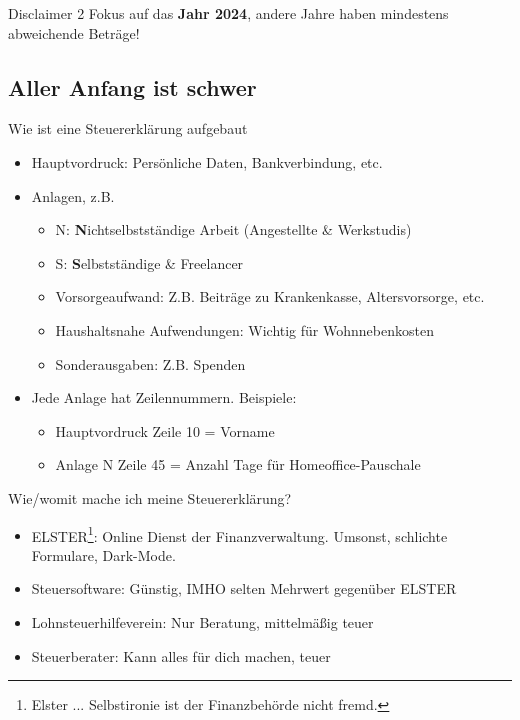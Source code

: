 \documentclass{beamer}
\begin{document}
		\begin{frame}{Disclaimer 2}
			Fokus auf das \textbf{Jahr 2024}, andere Jahre haben mindestens abweichende Beträge!
		\end{frame}
	
		\subsection{Aller Anfang ist schwer}

			\begin{frame}{Wie ist eine Steuererklärung aufgebaut}
				\begin{itemize}
					\item Hauptvordruck: Persönliche Daten, Bankverbindung, etc.
					\item Anlagen, z.B.
					\begin{itemize}
						\item N: \textbf{N}ichtselbstständige Arbeit (Angestellte \& Werkstudis)
						\item S: \textbf{S}elbstständige \& Freelancer
						\item Vorsorgeaufwand: Z.B. Beiträge zu Krankenkasse, Altersvorsorge, etc.
						\item Haushaltsnahe Aufwendungen: Wichtig für Wohnnebenkosten
						\item Sonderausgaben: Z.B. Spenden
					\end{itemize}
					\item Jede Anlage hat Zeilennummern. Beispiele:
					\begin{itemize}
						\item Hauptvordruck Zeile 10 = Vorname
						\item Anlage N Zeile 45 = Anzahl Tage für Homeoffice-Pauschale
					\end{itemize}
				\end{itemize}
			\end{frame}

			\begin{frame}{Wie/womit mache ich meine Steuererklärung?}
				\begin{itemize}
					\item ELSTER\footnote{Elster ... Selbstironie ist der Finanzbehörde nicht fremd.}: Online Dienst der Finanzverwaltung. Umsonst, schlichte Formulare, Dark-Mode.
					\item Steuersoftware: Günstig, IMHO selten Mehrwert gegenüber ELSTER
					\item Lohnsteuerhilfeverein: Nur Beratung, mittelmäßig teuer
					\item Steuerberater: Kann alles für dich machen, teuer
				\end{itemize}
			\end{frame}
		
\end{document}
